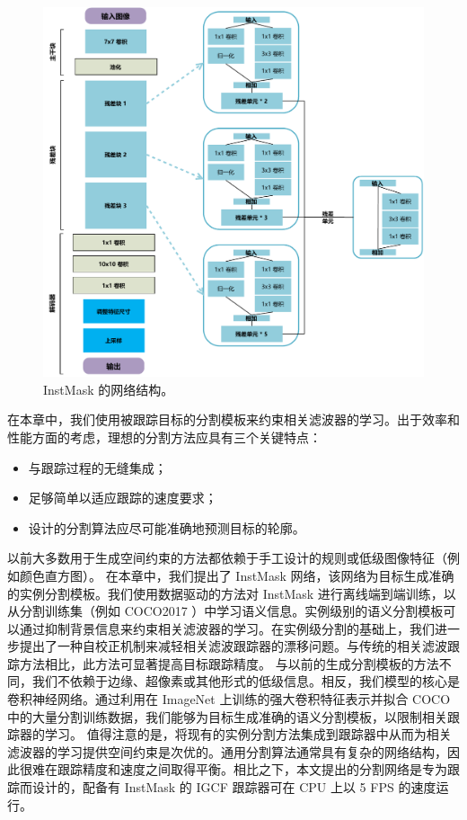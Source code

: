 \begin{figure}[t]
    \centering
    \includegraphics[width=1.0\textwidth]{Img/IGCF/net.pdf}
    \caption{InstMask 的网络结构。}
    \label{fig:IGCF_net}
\end{figure}

在本章中，我们使用被跟踪目标的分割模板来约束相关滤波器的学习。出于效率和性能方面的考虑，理想的分割方法应具有三个关键特点：

\begin{itemize}
\item 与跟踪过程的无缝集成；
\item 足够简单以适应跟踪的速度要求；
\item 设计的分割算法应尽可能准确地预测目标的轮廓。
\end{itemize}

以前大多数用于生成空间约束的方法都依赖于手工设计的规则或低级图像特征（例如颜色直方图）。
在本章中，我们提出了 InstMask 网络，该网络为目标生成准确的实例分割模板。我们使用数据驱动的方法对 InstMask 进行离线端到端训练，以从分割训练集（例如 COCO2017 \cite{COCO}）中学习语义信息。实例级别的语义分割模板可以通过抑制背景信息来约束相关滤波器的学习。在实例级分割的基础上，我们进一步提出了一种自校正机制来减轻相关滤波跟踪器的漂移问题。与传统的相关滤波跟踪方法相比，此方法可显著提高目标跟踪精度。
与以前的生成分割模板的方法不同，我们不依赖于边缘、超像素或其他形式的低级信息。相反，我们模型的核心是卷积神经网络。通过利用在 ImageNet \cite{ImageNet} 上训练的强大卷积特征表示并拟合 COCO 中的大量分割训练数据，我们能够为目标生成准确的语义分割模板，以限制相关跟踪器的学习。
值得注意的是，将现有的实例分割方法集成到跟踪器中从而为相关滤波器的学习提供空间约束是次优的。通用分割算法通常具有复杂的网络结构，因此很难在跟踪精度和速度之间取得平衡。相比之下，本文提出的分割网络是专为跟踪而设计的，配备有 InstMask 的 IGCF 跟踪器可在 CPU 上以 5 FPS 的速度运行。

